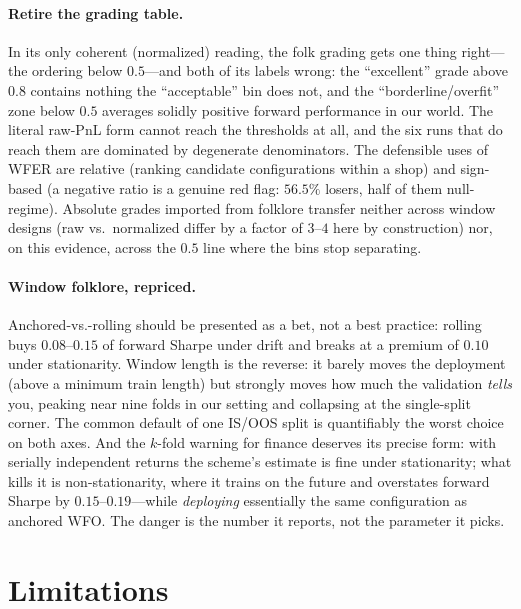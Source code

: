\documentclass[11pt]{article}
\begin{document}
\paragraph{Retire the grading table.} In its only coherent (normalized)
reading, the folk grading gets one thing right---the ordering below
$0.5$---and both of its labels wrong: the ``excellent'' grade above $0.8$
contains nothing the ``acceptable'' bin does not, and the
``borderline/overfit'' zone below $0.5$ averages solidly positive forward
performance in our world. The literal raw-PnL form cannot reach the
thresholds at all, and the six runs that do reach them are dominated by
degenerate denominators. The defensible uses of WFER are relative (ranking
candidate configurations within a shop) and sign-based (a negative ratio is a
genuine red flag: $56.5\%$ losers, half of them null-regime). Absolute
grades imported from folklore transfer neither across window designs (raw
vs.\ normalized differ by a factor of $3$--$4$ here by construction) nor, on
this evidence, across the $0.5$ line where the bins stop separating.

\paragraph{Window folklore, repriced.} Anchored-vs.-rolling should be
presented as a bet, not a best practice: rolling buys $0.08$--$0.15$ of
forward Sharpe under drift and breaks at a premium of $0.10$ under
stationarity. Window length is the reverse: it barely moves the deployment
(above a minimum train length) but strongly moves how much the validation
\emph{tells} you, peaking near nine folds in our setting and collapsing at
the single-split corner. The common default of one IS/OOS split is
quantifiably the worst choice on both axes. And the $k$-fold warning for
finance deserves its precise form: with serially independent returns the
scheme's estimate is fine under stationarity; what kills it is
non-stationarity, where it trains on the future and overstates forward
Sharpe by $0.15$--$0.19$---while \emph{deploying} essentially the same
configuration as anchored WFO. The danger is the number it reports, not the
parameter it picks.

\section{Limitations}
\label{sec:limitations}
\end{document}
